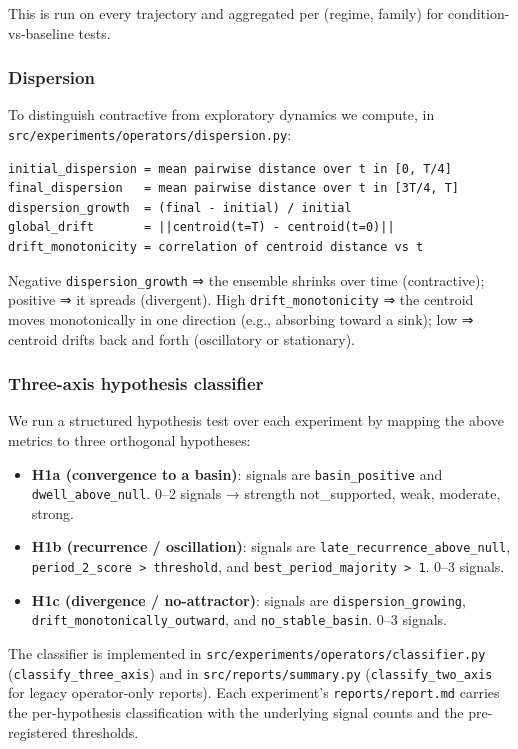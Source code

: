 \documentclass{article}
\theoremstyle{plain}
\theoremstyle{definition}
\begin{document}
This is run on every trajectory and aggregated per (regime, family) for
condition-vs-baseline tests.

\subsubsection{Dispersion}

To distinguish contractive from exploratory dynamics we compute, in
\texttt{src/experiments/operators/dispersion.py}:

\begin{verbatim}
initial_dispersion = mean pairwise distance over t in [0, T/4]
final_dispersion   = mean pairwise distance over t in [3T/4, T]
dispersion_growth  = (final - initial) / initial
global_drift       = ||centroid(t=T) - centroid(t=0)||
drift_monotonicity = correlation of centroid distance vs t
\end{verbatim}

Negative \texttt{dispersion\_growth} ⇒ the ensemble shrinks over time
(contractive); positive ⇒ it spreads (divergent). High
\texttt{drift\_monotonicity} ⇒ the centroid moves monotonically in one
direction (e.g., absorbing toward a sink); low ⇒ centroid drifts back
and forth (oscillatory or stationary).

\subsubsection{Three-axis hypothesis classifier}

We run a structured hypothesis test over each experiment by mapping the
above metrics to three orthogonal hypotheses:

\begin{itemize}
  \item \textbf{H1a (convergence to a basin)}: signals are \texttt{basin\_positive} and
  \texttt{dwell\_above\_null}. 0–2 signals → strength {not\_supported, weak,
  moderate, strong}.
  \item \textbf{H1b (recurrence / oscillation)}: signals are
  \texttt{late\_recurrence\_above\_null}, \texttt{period\_2\_score > threshold}, and
  \texttt{best\_period\_majority > 1}. 0–3 signals.
  \item \textbf{H1c (divergence / no-attractor)}: signals are
  \texttt{dispersion\_growing}, \texttt{drift\_monotonically\_outward}, and
  \texttt{no\_stable\_basin}. 0–3 signals.
\end{itemize}

The classifier is implemented in
\texttt{src/experiments/operators/classifier.py} (\texttt{classify\_three\_axis}) and
in \texttt{src/reports/summary.py} (\texttt{classify\_two\_axis} for legacy
operator-only reports). Each experiment's \texttt{reports/report.md} carries
the per-hypothesis classification with the underlying signal counts
and the pre-registered thresholds.
\end{document}
